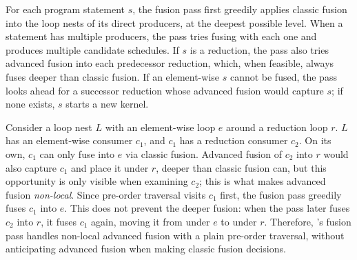 For each program statement $s$, the fusion pass first greedily applies classic fusion
into the loop nests of its direct producers, at the deepest possible level.
When a statement has multiple producers, the pass tries fusing with each one and produces
multiple candidate schedules.
If $s$ is a reduction, the pass also tries advanced fusion into each predecessor
reduction, which, when feasible, always fuses deeper than classic fusion.
If an element-wise $s$ cannot be fused, the pass looks ahead for a successor reduction
whose advanced fusion would capture $s$; if none exists, $s$ starts a new kernel.

Consider a loop nest $L$ with an element-wise loop $e$ around a reduction loop $r$.
$L$ has an element-wise consumer $c_1$, and $c_1$ has a reduction consumer $c_2$.
On its own, $c_1$ can only fuse into $e$ via classic fusion.
Advanced fusion of $c_2$ into $r$ would also capture $c_1$ and place it under $r$,
deeper than classic fusion can, but this opportunity is only visible when examining $c_2$;
this is what makes advanced fusion \emph{non-local}.
Since pre-order traversal visits $c_1$ first, the fusion pass greedily fuses $c_1$ into $e$.
This does not prevent the deeper fusion: when the pass later fuses $c_2$ into $r$,
it fuses $c_1$ again, moving it from under $e$ to under $r$.
Therefore, \NAME{}'s fusion pass handles non-local advanced fusion with a plain
pre-order traversal, without anticipating advanced fusion when making classic fusion decisions.



